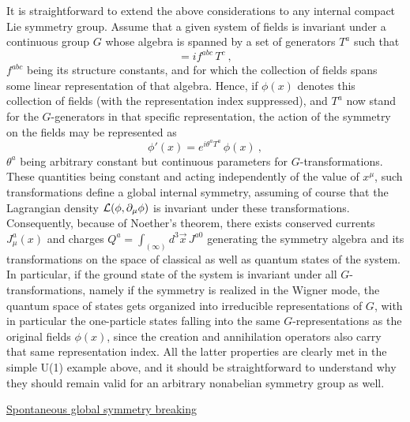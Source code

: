 \documentclass[a4paper,11pt]{article}
\begin{document}
It is straightforward to extend the above considerations to any internal
compact Lie symmetry group. Assume that a given system of fields is invariant
under a continuous group $G$ whose algebra is spanned by a set of generators
$T^a$ such that
\begin{equation}
[T^a,T^b]=if^{abc}\,T^c\ ,
\end{equation}
$f^{abc}$ being its structure constants, and for which the collection of
fields spans some linear representation of that algebra. Hence, if
$\phi(x)$ denotes this collection of fields (with the representation index
suppressed), and $T^a$ now stand for the $G$-generators in that specific
representation, the action of the symmetry on the fields may be represented
as
\begin{equation}
\phi'(x)=e^{i\theta^aT^a}\,\phi(x)\ ,
\end{equation}
$\theta^a$ being arbitrary constant but continuous parameters for 
$G$-transformations. These quantities being constant and acting independently
of the value of $x^\mu$, such transformations define a global internal
symmetry, assuming of course that the Lagrangian density 
${\cal L}(\phi,\partial_\mu\phi)$ is invariant under these transformations.
Consequently, because of Noether's theorem, there exists conserved
currents $J^a_\mu(x)$ and charges $Q^a=\int_{(\infty)}d^3\vec{x}\,J^{a0}$
generating the symmetry algebra and its transformations on the space
of classical as well as quantum states of the system. In particular,
if the ground state of the system is invariant under all $G$-transformations,
namely if the symmetry is realized in the Wigner mode,
the quantum space of states gets organized into irreducible representations 
of $G$, with in particular the one-particle states falling into the same 
$G$-representations as the original fields $\phi(x)$, since the creation 
and annihilation operators also carry that same representation index. 
All the latter properties are clearly met in the simple U(1) example above,
and it should be straightforward to understand why they should remain valid
for an arbitrary nonabelian symmetry group as well.

\vspace{10pt}

\noindent\underline{Spontaneous global symmetry breaking}

\vspace{5pt}
\end{document}
